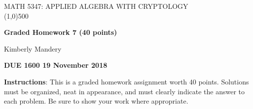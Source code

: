 \documentclass[12pt]{article}
\begin{document}
              

\begin{centering}
	
	MATH 5347: APPLIED ALGEBRA WITH CRYPTOLOGY\\

 \line(1,0){500}

\end{centering}

	\par\vspace{3mm}

\begin{centering}
	{\bf Graded Homework 7 (40 points)}
	\par\vspace{1mm}
	{ Kimberly Mandery}
	\par\vspace{1mm}
	{\bf DUE 1600 19 November 2018}


\end{centering}



\vspace{3mm}

{\bf Instructions}: This is a graded homework assignment worth 40 points.  Solutions must be organized, neat in appearance, and must clearly indicate the answer to each problem.  Be sure to show your work where appropriate.  

\vspace{5mm}
\end{document}
